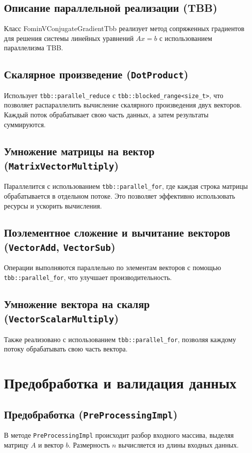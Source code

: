 \documentclass[12pt]{article}
\begin{document}
\subsection{Описание параллельной реализации (TBB)}

\hspace*{1.35em}Класс FominVConjugateGradientTbb реализует метод сопряженных градиентов для решения системы линейных уравнений \( Ax = b \) с использованием параллелизма TBB.
\subsection{Скалярное произведение (\texttt{DotProduct})}
Использует \texttt{tbb::parallel\_reduce} с \texttt{tbb::blocked\_range<size\_t>}, что позволяет распараллелить вычисление скалярного произведения двух векторов. Каждый поток обрабатывает свою часть данных, а затем результаты суммируются.

\subsection{Умножение матрицы на вектор (\texttt{MatrixVectorMultiply})}
Параллелится с использованием \texttt{tbb::parallel\_for}, где каждая строка матрицы обрабатывается в отдельном потоке. Это позволяет эффективно использовать ресурсы и ускорить вычисления.

\subsection{Поэлементное сложение и вычитание векторов (\texttt{VectorAdd}, \texttt{VectorSub})}
Операции выполняются параллельно по элементам векторов с помощью \texttt{tbb::parallel\_for}, что улучшает производительность.

\subsection{Умножение вектора на скаляр (\texttt{VectorScalarMultiply})}
Также реализовано с использованием \texttt{tbb::parallel\_for}, позволяя каждому потоку обрабатывать свою часть вектора.

\section{Предобработка и валидация данных}

\subsection{Предобработка (\texttt{PreProcessingImpl})}
В методе \texttt{PreProcessingImpl} происходит разбор входного массива, выделяя матрицу \( A \) и вектор \( b \). Размерность \( n \) вычисляется из длины входных данных.
\end{document}
